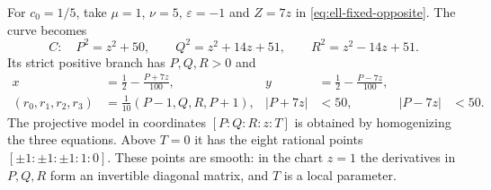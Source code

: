 For $c_0=1/5$, take $\mu=1$, $\nu=5$, $\varepsilon=-1$ and
$Z=7z$ in \eqref{eq:ell-fixed-opposite}.  The curve becomes
\begin{equation}\label{eq:ell-one-fifth}
 C:\quad P^2=z^2+50,\qquad
 Q^2=z^2+14z+51,\qquad R^2=z^2-14z+51.
\end{equation}
Its strict positive branch has $P,Q,R>0$ and
\begin{equation}\label{eq:ell-one-fifth-return}
 \begin{aligned}
 x&=\tfrac12-\frac{P+7z}{100},&
 y&=\tfrac12-\frac{P-7z}{100},\\
 (r_0,r_1,r_2,r_3)&=\tfrac1{10}(P-1,Q,R,P+1),&
 |P+7z|&<50,&|P-7z|&<50.
 \end{aligned}
\end{equation}
The projective model in coordinates $[P:Q:R:z:T]$ is obtained by
homogenizing the three equations.  Above $T=0$ it has the eight
rational points $[\pm1:\pm1:\pm1:1:0]$.  These points are smooth:
in the chart $z=1$ the derivatives in $P,Q,R$ form an invertible
diagonal matrix, and $T$ is a local parameter.

